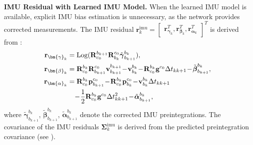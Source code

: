 \noindent \textbf{IMU Residual with Learned IMU Model.} When the learned IMU model is available, explicit IMU bias estimation is unnecessary, as the network provides corrected measurements. The IMU residual $\mathbf{r}^{\text{imu}}_k = \begin{bmatrix}
\mathbf{r}_{\bm{\gamma}_k}^T, \mathbf{r}_{\bm{\beta}_k}^T, \mathbf{r}_{\bm{\alpha}_k}^T
\end{bmatrix}^T$ is derived from :
\begin{align}
\label{eq:maci2:inte_res_r}
\mathbf{r}_{\bm{\gamma}_k} &= \text{Log} (\mathbf{R}^{b_{k+1}}_{c_0} \mathbf{R}^{c_0}_{b_k}\tilde{\boldsymbol{\gamma}}_{b_{k+1}}^{b_k}), \\
\mathbf{r}_{\bm{\beta}_k} &= \mathbf{R}^{b_k}_{c_0} \mathbf{R}^{c_0}_{b_{k+1}} \mathbf{v}_{b_{k+1}}^{b_{k+1}} \!-\! \mathbf{v}_{b_k}^{b_k} \!-\! \mathbf{R}^{b_k}_{c_0} \mathbf{g}^{c_0} \Delta t_{kk+1} \!-\! \tilde{\boldsymbol{\beta}}_{b_{k+1}}^{b_k},
\label{eq:maci2:inte_res_v}
\\
\mathbf{r}_{\bm{\alpha}_k} &= \mathbf{R}^{b_k}_{c_0} \mathbf{p}_{b_{k+1}}^{c_0} \!-\! \mathbf{R}^{b_k}_{c_0} \mathbf{p}_{b_k}^{c_0} \!-\! \mathbf{v}_{b_k}^{b_k}\Delta t_{kk+1} \notag \\
& \quad \!-\! \frac{1}{2}\mathbf{R}^{b_k}_{c_0}\mathbf{g}^{c_0}\Delta t_{kk+1}^2 \!-\! \tilde{\boldsymbol{\alpha}}_{b_{k+1}}^{b_k},
\label{eq:maci2:inte_res_p}
\end{align}
where $\tilde{\boldsymbol{\gamma}}_{b_{k+1}}^{b_k}$, $\tilde{\boldsymbol{\beta}}_{b_{k+1}}^{b_k}$, $\tilde{\boldsymbol{\alpha}}_{b_{k+1}}^{b_k}$ denote the corrected IMU preintegrations. The covariance of the IMU residuals $\bm{\Sigma}^{\text{imu}}_k$ is derived from the predicted preintegration covariance (see ).

